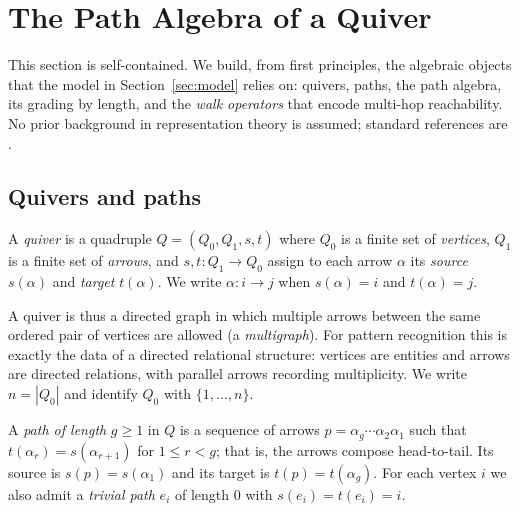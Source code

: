 \section{The Path Algebra of a Quiver}\label{sec:algebra}

This section is self-contained. We build, from first principles, the algebraic
objects that the model in Section~\ref{sec:model} relies on: quivers, paths, the
path algebra, its grading by length, and the \emph{walk operators} that encode
multi-hop reachability. No prior background in representation theory is assumed;
standard references are \cite{schiffler2014quiver,assem2006elements}.

\subsection{Quivers and paths}

\begin{definition}[Quiver]
A \emph{quiver} is a quadruple $Q=(Q_0,Q_1,s,t)$ where $Q_0$ is a finite set of
\emph{vertices}, $Q_1$ is a finite set of \emph{arrows}, and
$s,t\colon Q_1\to Q_0$ assign to each arrow $\alpha$ its \emph{source}
$s(\alpha)$ and \emph{target} $t(\alpha)$. We write $\alpha\colon i\to j$ when
$s(\alpha)=i$ and $t(\alpha)=j$.
\end{definition}

A quiver is thus a directed graph in which multiple arrows between the same
ordered pair of vertices are allowed (a \emph{multigraph}). For pattern
recognition this is exactly the data of a directed relational structure: vertices
are entities and arrows are directed relations, with parallel arrows recording
multiplicity. We write $n=|Q_0|$ and identify $Q_0$ with $\{1,\dots,n\}$.

\begin{definition}[Path]
A \emph{path of length} $g\ge 1$ in $Q$ is a sequence of arrows
$p=\alpha_g\cdots\alpha_2\alpha_1$ such that $t(\alpha_r)=s(\alpha_{r+1})$ for
$1\le r<g$; that is, the arrows compose head-to-tail. Its source is
$s(p)=s(\alpha_1)$ and its target is $t(p)=t(\alpha_g)$. For each vertex $i$ we
also admit a \emph{trivial path} $e_i$ of length $0$ with $s(e_i)=t(e_i)=i$.
\end{definition}

